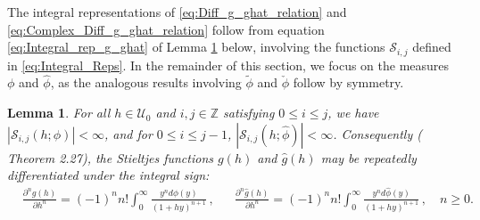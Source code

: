 \documentclass[english,12pt,jmp,graphicx]{revtex4-1}
\newtheorem{lemma}{Lemma}[section]
\newcommand{\ph}{\hat{\phi}}
\begin{document}
The integral representations of \eqref{eq:Diff_g_ghat_relation} and 
\eqref{eq:Complex_Diff_g_ghat_relation} follow from equation
\eqref{eq:Integral_rep_g_ghat} of Lemma \ref{lem:L1_Sij} below,
involving the functions $\mathcal{S}_{i,j}$ defined in
\eqref{eq:Integral_Reps}. In the remainder of this section, we focus
on the measures $\phi$ and $\ph$, as the analogous results
involving $\tilde{\phi}$ and $\check{\phi}$ follow by symmetry. 


\begin{lemma}\label{lem:L1_Sij}  
  For all $h\in\mathcal{U}_0$ and $i,j\in\mathbb{Z}$ satisfying $0\leq i\leq j$,
  we have $|\mathcal{S}_{i,j}(h;\phi)|<\infty$, and for $0\leq i\leq j-1$,
  $|\mathcal{S}_{i,j}(h;\ph)|<\infty$. Consequently (\cite{Folland:99}
  Theorem 2.27), the Stieltjes functions $g(h)$ and $\hat{g}(h)$ may
  be repeatedly differentiated under the integral sign: 
  \begin{align}\label{eq:Integral_rep_g_ghat}
    &\frac{\partial^ng(h)}{\partial h^n}%
                     =(-1)^nn!\int_0^\infty\frac{y^nd\phi(y)}{(1+hy)^{n+1}}\,,
         &&
    \frac{\partial^n\hat{g}(h)}{\partial h^n}%
                     =(-1)^nn!\int_0^\infty\frac{y^nd\ph(y)}{(1+hy)^{n+1}}\,,
                     \quad n\geq0.
  \end{align}
\end{lemma}
%
\end{document}

